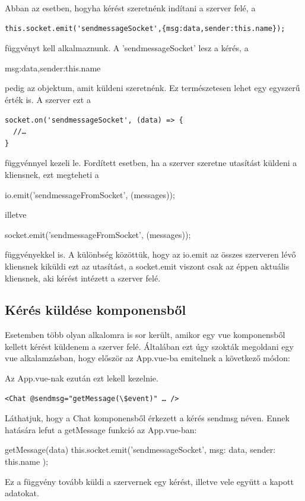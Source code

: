 Abban az esetben, hogyha kérést szeretnénk indítani a szerver felé, a

\begin{verbatim}
this.socket.emit('sendmessageSocket',{msg:data,sender:this.name});
\end{verbatim}

függvényt kell alkalmaznunk. A 'sendmessageSocket' lesz a kérés, a 
\begin{javascript}
{msg:data,sender:this.name}
\end{javascript}
pedig az objektum, amit küldeni szeretnénk. Ez természetesen lehet egy egyszerű érték is. A szerver ezt a

\begin{verbatim}
socket.on('sendmessageSocket', (data) => {
  //…
}
\end{verbatim}

függvénnyel kezeli le. Fordített esetben, ha a szerver szeretne utasítást küldeni a kliensnek, ezt megteheti a

\begin{javascript}
io.emit('sendmessageFromSocket', (messages));
\end{javascript}

illetve

\begin{javascript}
socket.emit('sendmessageFromSocket', (messages));
\end{javascript}

függvényekkel is. A különbség közöttük, hogy az io.emit az összes szerveren lévő kliensnek kiküldi ezt az utasítást, a socket.emit viszont csak az éppen aktuális kliensnek, aki kérést intézett a szerver felé.

\subsection{Kérés küldése komponensből}
Esetemben több olyan alkalomra is sor került, amikor egy vue komponensből kellett kérést küldenem a szerver felé. Általában ezt úgy szokták megoldani egy vue alkalamzásban, hogy először az App.vue-ba emitelnek a következő módon:
Az App.vue-nak ezután ezt lekell kezelnie.
\begin{verbatim}
<Chat @sendmsg="getMessage(\$event)" … />
\end{verbatim}%
Láthatjuk, hogy a Chat komponensből érkezett a kérés sendmsg néven. Ennek hatására lefut a getMessage funkció az App.vue-ban:
\begin{javascript}
getMessage(data){
  this.socket.emit('sendmessageSocket', {
    msg: data, sender: this.name
  });
}
\end{javascript}
Ez a függvény tovább küldi a szervernek egy kérést, illetve vele együtt a kapott adatokat.

